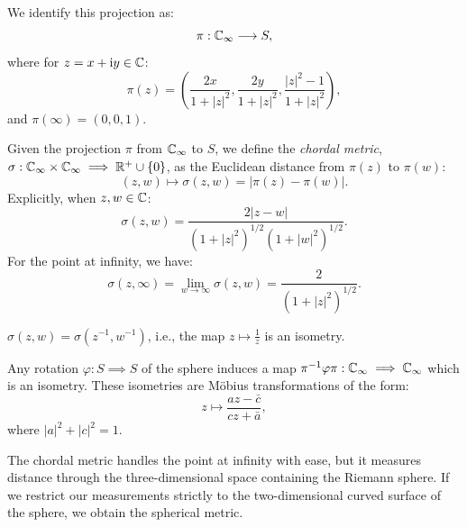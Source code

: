 We identify this projection as:
\begin{equation*}
    \pi : \mathbb{C}_\infty \longrightarrow S,
\end{equation*}
where for $z = x + \mathrm{i} y \in \mathbb{C}$:
\begin{equation*}
    \pi(z) = \left( \frac{2x}{1+|z|^2}, \frac{2y}{1+|z|^2}, \frac{|z|^2-1}{1+|z|^2} \right),
\end{equation*}
and $\pi(\infty) = (0,0,1)$.

\begin{definition}
    Given the projection $\pi$ from $\mathbb{C}_\infty$ to $S$, we define the \emph{chordal
    metric}, $\sigma : \mathbb{C}_\infty \times \mathbb{C}_\infty \implies \mathbb{R}^+ \cup \{0\}$, as the
    Euclidean distance from $\pi(z)$ to $\pi(w)$:
    \begin{equation*}
        (z,w) \mapsto \sigma(z,w) = |\pi(z) - \pi(w)|.
    \end{equation*}
    Explicitly, when $z, w \in \mathbb{C}$:
    \begin{equation*}
        \sigma(z,w) = \frac{2|z-w|}{(1+|z|^2)^{1/2}(1+|w|^2)^{1/2}}.
    \end{equation*}
    For the point at infinity, we have:
    \begin{equation*}
        \sigma(z,\infty) = \lim_{w \to \infty} \sigma(z,w) = \frac{2}{(1+|z|^2)^{1/2}}.
    \end{equation*}
\end{definition}

\begin{remark}
    $\sigma(z,w) = \sigma(z^{-1}, w^{-1})$, i.e., the map $z \mapsto
    \frac{1}{z}$ is an isometry.
\end{remark}

\begin{remark}
    Any rotation $\varphi: S \implies S$ of the sphere induces a map
    $\pi^{-1} \varphi \pi : \mathbb{C}_\infty \implies \mathbb{C}_\infty$ which is an isometry. These
    isometries are Möbius transformations of the form:
    \begin{equation*}
        z \mapsto \frac{a z - \bar{c}}{c z + \bar{a}},
    \end{equation*}
    where $|a|^2 + |c|^2 = 1$.
\end{remark}

The chordal metric handles the point at infinity with ease, but it measures
distance through the three-dimensional space containing the Riemann sphere. If
we restrict our measurements strictly to the two-dimensional curved surface of
the sphere, we obtain the spherical metric.

